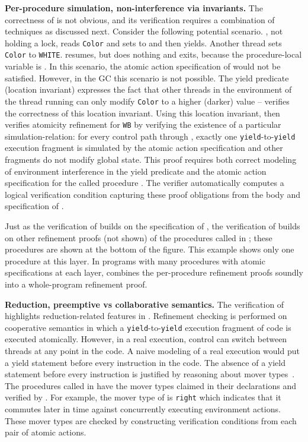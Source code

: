 {\bf Per-procedure simulation, non-interference via invariants.}
The correctness of  is not obvious, and its verification
requires a combination of techniques as discussed next. 
Consider the following potential scenario. 
, not holding a lock, reads {\tt Color} and
sets  to  and then yields. Another thread sets {\tt Color} to
{\tt WHITE}.  resumes, but does nothing and exits,
because the procedure-local variable  is . In this scenario, the atomic action
specification of  would not be satisfied. However, in the GC this
scenario is not possible. 
The yield predicate (location invariant) expresses the fact that
other threads in the environment of the thread running  can
only modify {\tt Color} to a higher (darker) value -- \civl verifies the correctness
of this location invariant.
Using this location invariant, \civl then verifies atomicity
refinement for {\tt WB} by verifying the existence of a particular simulation-relation:
for every control path through , exactly one {\tt yield}-to-{\tt yield} execution
fragment is simulated by the atomic action specification and other fragments do not modify
global state. 
This proof requires both correct modeling of environment interference in the yield predicate
and the atomic action specification for the called procedure .
The \civl verifier automatically computes a logical verification condition capturing
these proof obligations from the body and specification of .

Just as the verification of  builds on the specification of ,
the verification of  builds on other refinement proofs (not shown) 
of the procedures called in ;
these procedures are shown at the bottom of the figure. 
This example shows only one procedure at this layer. In programs
with many procedures with atomic specifications at each layer,
\civl combines the per-procedure refinement proofs soundly into a
whole-program refinement proof. 

{\bf Reduction, preemptive vs collaborative semantics.}
The verification of  highlights reduction-related features
in \civl. 
Refinement checking is performed on cooperative semantics in which a 
{\tt yield}-to-{\tt yield} execution fragment of code is executed atomically.
However, in a real execution, control can switch between threads at any point in the code. 
A naive modeling of a real execution would put a yield statement before every instruction in the code.
The absence of a yield statement before every instruction is justified by reasoning about mover types~\cite{FlanaganFLQ08}. 
The procedures called in  have the mover types claimed in their
declarations and verified by \civl. 
For example, the mover type of  is {\tt right} which indicates 
that it commutes later in time against concurrently executing environment actions.
These mover types are checked by constructing verification conditions from each pair of atomic actions.

